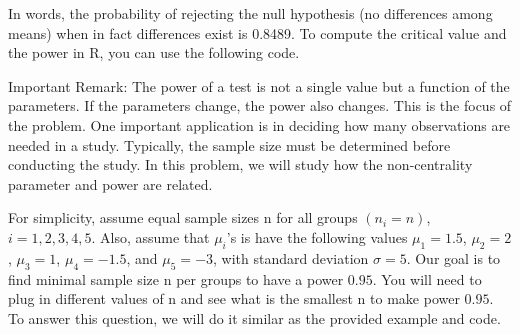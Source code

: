 \documentclass{article}
\begin{document}
In words, the probability of rejecting the null hypothesis (no differences among means) when in
fact differences exist is 0.8489. To compute the critical value and the power in R, you can use the
following code.

Important Remark: The power of a test is not a single value but a function of the parameters. If
the parameters change, the power also changes. This is the focus of the problem. One important
application is in deciding how many observations are needed in a study. Typically, the sample
size must be determined before conducting the study. In this problem, we will study how the
non-centrality parameter and power are related.

For simplicity, assume equal sample sizes n for all groups $(n_i = n)$, $i = 1, 2, 3, 4, 5$. Also, assume
that $\mu_i$'s is have the following values $\mu_1 = 1.5$, $\mu_2 = 2$, $\mu_3 = 1$, $\mu_4 = -1.5$, and $\mu_5 = -3$, with standard
deviation $\sigma = 5$. Our goal is to find minimal sample size n per groups to have a power $0.95$. You
will need to plug in different values of n and see what is the smallest n to make power $0.95$. To
answer this question, we will do it similar as the provided example and code.
\end{document}
